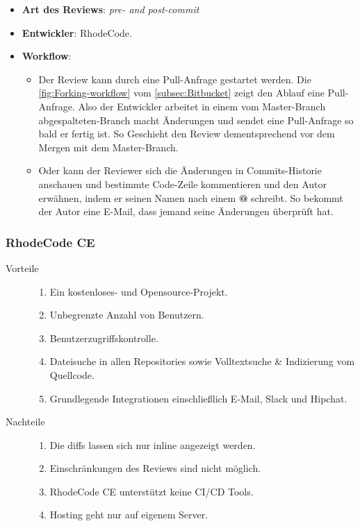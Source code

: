 \begin{itemize}
	\item \textbf{Art des Reviews}: \textit{pre- and post-commit}
	\item \textbf{Entwickler}: RhodeCode.
	\item \textbf{Workflow}:
	\begin{itemize}
		\item Der Review kann durch eine Pull-Anfrage gestartet werden. Die \cref{fig:Forking-workflow} vom \cref{subsec:Bitbucket} zeigt den Ablauf
			eine Pull-Anfrage. Also der Entwickler arbeitet in einem vom Master-Branch abgespalteten-Branch macht Änderungen und sendet eine Pull-Anfrage so bald er fertig ist. 
			So Geschieht den Review dementsprechend vor dem Mergen mit dem Master-Branch.
		\item Oder kann der Reviewer sich die Änderungen in Commits-Historie anschauen und bestimmte Code-Zeile kommentieren und den Autor erwähnen, indem er seinen Namen nach einem 
			\textbf{@} schreibt. So bekommt der Autor eine E-Mail, dass jemand seine Änderungen überprüft hat.
	\end{itemize}
\end{itemize}

\subsubsection{RhodeCode CE}
\label{subsubsec:RhodeCode CE}

\begin{description}
	\item [Vorteile] \hfill
		\begin{enumerate}
			\item Ein kostenloses- und Opensource-Projekt.
			\item Unbegrenzte Anzahl von Benutzern.
			\item Benutzerzugriffskontrolle.
			\item Dateisuche in allen Repositories sowie Volltextsuche \& Indizierung vom Quellcode.
			\item Grundlegende Integrationen einschließlich E-Mail, Slack und Hipchat.
		\end{enumerate}
	\item [Nachteile] \hfill
		\begin{enumerate}
			\item Die diffs lassen sich nur inline angezeigt werden.
			\item Einschränkungen des Reviews sind nicht möglich.
			\item RhodeCode CE unterstützt keine \ac{CI}/\ac{CD} Tools.
			\item Hosting geht nur auf eigenem Server.
		\end{enumerate}
\end{description}

